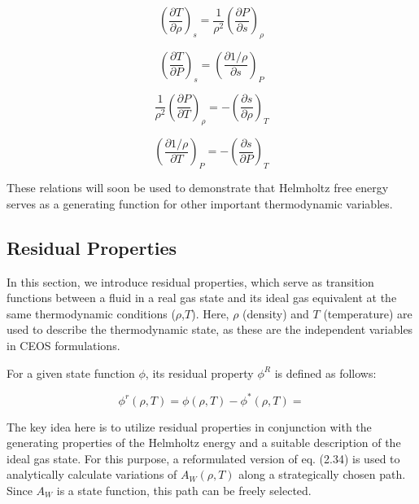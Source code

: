 	\begin{equation}
		\left(\frac{\partial T}{\partial \rho}\right)_s = \frac{1}{\rho ^2}\left(\frac{\partial P}{\partial s}\right)_{\rho}
	\end{equation}

	\begin{equation}
		\left(\frac{\partial T}{\partial P}\right)_s = \left(\frac{\partial 1/\rho}{\partial s}\right)_P 
	\end{equation}

	\begin{equation}
		\frac{1}{\rho ^2}\left(\frac{\partial P}{\partial T}\right)_{\rho} = -\left(\frac{\partial s}{\partial \rho}\right)_T
	\end{equation}

	\begin{equation}
		\left(\frac{\partial 1/\rho}{\partial T}\right)_P = -\left(\frac{\partial s}{\partial P}\right)_T
	\end{equation}

	These relations will soon be used to demonstrate that Helmholtz free energy
	serves as a generating function for other important thermodynamic variables.

	\subsection{Residual Properties}

	In this section, we introduce residual properties, which serve as transition
	functions between a fluid in a real gas state and its ideal gas equivalent
	at the same thermodynamic conditions ($\rho$,$T$). Here, $\rho$ (density) and $T$
	(temperature) are used to describe the thermodynamic state, as these are the
	independent variables in CEOS formulations.

For a given state function $\phi$, its residual property $\phi^R$ is defined as
follows:

\begin{equation}
	\phi^r(\rho, T) = \phi(\rho, T) - \phi^*(\rho, T) = 
\end{equation}

The key idea here is to utilize residual properties in conjunction with the
generating properties of the Helmholtz energy and a suitable description of the
ideal gas state. For this purpose, a reformulated version of eq. (2.34) is used
to analytically calculate variations of $A_W(\rho,T)$ along a strategically
chosen path. Since $A_W$ is a state function, this path can be freely selected.

